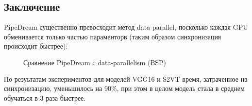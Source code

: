 \subsection{Заключение}
PipeDream существенно превосходит метод data-parallel, посколько каждая GPU обменивается только частью параменторв (таким образом синхронизация происходит быстрее):

\begin{figure}[h]%
	\centering
	\caption{Сравнение PipeDream с data-parallelism (BSP)}
	\label{framework} %
\end{figure}

По резуьтатам экспериментов для моделей VGG16 и S2VT время, затраченное на синхронизацию, уменьшилось на 90\%, при этом в целом модель стала в среднем обучаться в 3 раза быстрее.